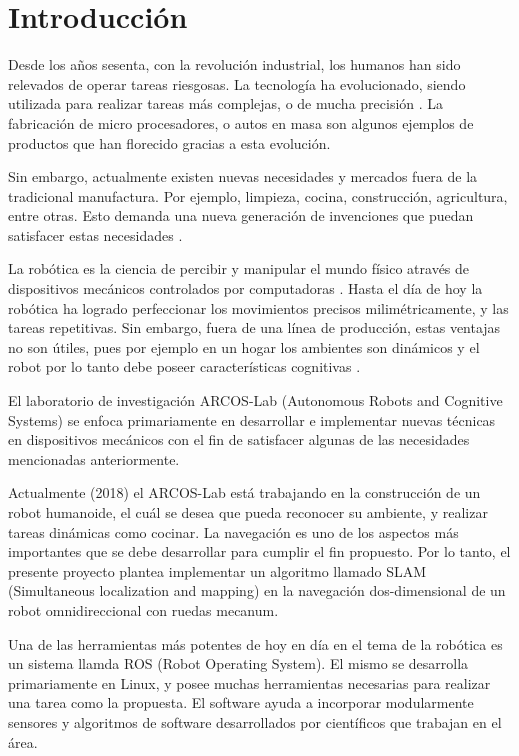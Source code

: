   \chapter{Introducción}
\label{C:introduccion}



Desde los años sesenta, con la revolución industrial, los humanos han sido relevados de operar tareas riesgosas. La tecnología ha evolucionado, siendo utilizada para realizar tareas más complejas, o de mucha precisión \cite{Garcia2007}. La fabricación de micro procesadores, o autos en masa son algunos ejemplos de productos que han florecido gracias a esta evolución.

Sin embargo, actualmente existen nuevas necesidades y mercados fuera de la tradicional manufactura. Por ejemplo, limpieza, cocina, construcción, agricultura, entre otras. Esto demanda una nueva generación de invenciones que puedan satisfacer estas necesidades \cite{Garcia2007}.

La robótica es la ciencia de percibir y manipular el mundo físico através de dispositivos mecánicos controlados por computadoras \cite{Thrun2005}. Hasta el día de hoy la robótica ha logrado perfeccionar los movimientos precisos milimétricamente, y las tareas repetitivas. Sin embargo, fuera de una línea de producción, estas ventajas no son útiles, pues por ejemplo en un hogar los ambientes son dinámicos y el robot por lo tanto debe poseer características cognitivas \cite{HelioAzevedoRenatoArcherITCenterandICM/USPJosePedroR.InstituteofMathematicalandComputerSciences2017}. 

El laboratorio de investigación ARCOS-Lab (Autonomous Robots and Cognitive Systems) se enfoca primariamente en desarrollar e implementar nuevas técnicas en dispositivos mecánicos con el fin de satisfacer algunas de las necesidades mencionadas anteriormente.

Actualmente (2018) el ARCOS-Lab está trabajando en la construcción de un robot humanoide, el cuál se desea que pueda reconocer su ambiente, y realizar tareas dinámicas como cocinar. La navegación es uno de los aspectos más importantes que se debe desarrollar para cumplir el fin propuesto. Por lo tanto, el presente proyecto plantea implementar un algoritmo llamado SLAM (Simultaneous localization and mapping) en la navegación dos-dimensional de un robot omnidireccional con ruedas mecanum. 

Una de las herramientas más potentes de hoy en día en el tema de la robótica es un sistema llamda ROS (Robot Operating System). El mismo se desarrolla primariamente en Linux, y posee muchas herramientas necesarias para realizar una tarea como la propuesta. El software ayuda a incorporar modularmente sensores y algoritmos de software desarrollados por científicos que trabajan en el área.

